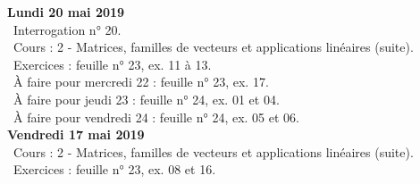 \documentclass[12pt,a4paper]{article}
\begin{document}
% 
% 
% 
% 
% 
% 
\noindent\textbf{Lundi 20 mai 2019}\\
\bu\ Interrogation n° 20.\\
\bu\ Cours : 2 - Matrices, familles de vecteurs et applications linéaires (suite).\\
\bu\ Exercices : feuille n° 23, ex. 11 à 13.\\
\bu\ À faire pour mercredi 22 : feuille n° 23, ex. 17.\\
\bu\ À faire pour jeudi 23 : feuille n° 24, ex. 01 et 04.\\
\bu\ À faire pour vendredi 24 : feuille n° 24, ex. 05 et 06.\vspace{.4cm}\\
 
\noindent\textbf{Vendredi 17 mai 2019}\\
\bu\ Cours : 2 - Matrices, familles de vecteurs et applications linéaires (suite).\\
\bu\ Exercices : feuille n° 23, ex. 08 et 16.\vspace{.4cm}\\
\end{document}
